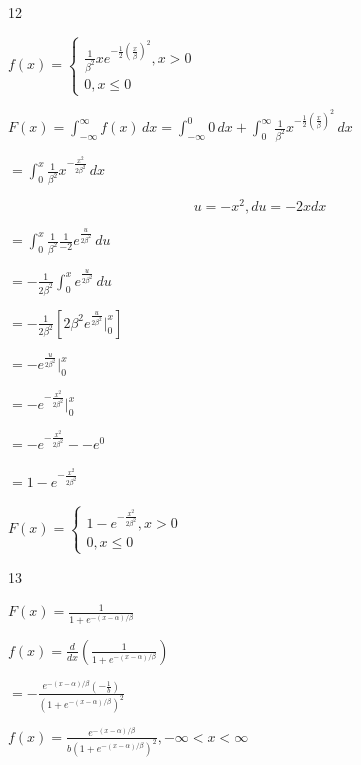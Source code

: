 \documentclass[12 pt]{article}
\begin{document}
    \begin{exercise}{12}
    \hfill

    $f(x) = \begin{cases}
        \frac{1}{{\beta}^2} x e^{- \frac{1}{2}(\frac{x}{\beta})^2}, x > 0 \\
        0, x \leq 0
    \end{cases}$

    $F(x) = \int_{- \infty}^{\infty} f(x) \, dx = \int_{- \infty}^{0} 0 \, dx + \int_{0}^{\infty} \frac{1}{{\beta}^2} x ^{- \frac{1}{2} (\frac{x}{\beta})^2} \, dx$

    $= \int_{0}^{x} \frac{1}{{\beta}^2} x ^{-\frac{x^2}{2{\beta}^2}} \, dx$

    $$u = -x^2, du = -2x dx$$

    $= \int_{0}^{x} \frac{1}{{\beta}^2} \frac{1}{-2} e^{\frac{u}{2 {\beta}^2}} \, du$

    $= -\frac{1}{2{\beta}^2} \int_{0}^{x} e^{\frac{u}{2 {\beta}^2}} \, du$

    $= - \frac{1}{2{\beta}^2} [2{\beta}^2 e^{\frac{u}{2{\beta}^2}} |_{0}^{x}]$

    $= -e^{\frac{u}{2{\beta}^2}} |_{0}^{x}$

    $= -e^{-\frac{x^2}{2{\beta}^2}} |_{0}^{x}$

    $= -e^{-\frac{x^2}{2{\beta}^2}}- - e^0$

    $= 1 - e^{-\frac{x^2}{2{\beta}^2}}$

    $F(x) = \begin{cases}
        1 - e^{-\frac{x^2}{2{\beta}^2}}, x>0 \\
        0, x \leq 0
    \end{cases}$

    \hfill
    \end{exercise}



    \begin{exercise}{13}
    \hfill

    $F(x) = \frac{1}{1 + e^{-(x - \alpha)/{\beta}}}$

    $f(x) = \frac{d}{dx}(\frac{1}{1+e^{-(x-\alpha)/{\beta}}})$

    $= - \frac{e^{-(x - \alpha)/{\beta}}(-\frac{1}{b})}{(1+e^{-(x-\alpha)/{\beta}})^2}$

    $f(x) = \frac{e^{-(x - \alpha)/{\beta}}}{b(1+e^{-(x-\alpha)/{\beta}})^2}, - \infty < x < \infty$

    \hfill
    \end{exercise}
\end{document}
